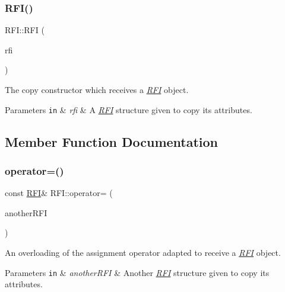 \subsubsection{\texorpdfstring{R\+F\+I()}{RFI()}}
{\footnotesize\ttfamily R\+F\+I\+::\+R\+FI (\begin{DoxyParamCaption}\item[{const \hyperlink{structRFI}{R\+FI} \&}]{rfi }\end{DoxyParamCaption})\hspace{0.3cm}{\ttfamily [inline]}}



The copy constructor which receives a {\itshape \hyperlink{structRFI}{R\+FI}} object. 


\begin{DoxyParams}[1]{Parameters}
\mbox{\tt in}  & {\em rfi} & A {\itshape \hyperlink{structRFI}{R\+FI}} structure given to copy its attributes. \\
\hline
\end{DoxyParams}


\subsection{Member Function Documentation}
\mbox{\label{structRFI_a8fcc866a09f2f88a9754e04a1d056104}} 
\subsubsection{\texorpdfstring{operator=()}{operator=()}}
{\footnotesize\ttfamily const \hyperlink{structRFI}{R\+FI}\& R\+F\+I\+::operator= (\begin{DoxyParamCaption}\item[{const \hyperlink{structRFI}{R\+FI} \&}]{another\+R\+FI }\end{DoxyParamCaption})\hspace{0.3cm}{\ttfamily [inline]}}



An overloading of the assignment operator adapted to receive a {\itshape \hyperlink{structRFI}{R\+FI}} object. 


\begin{DoxyParams}[1]{Parameters}
\mbox{\tt in}  & {\em another\+R\+FI} & Another {\itshape \hyperlink{structRFI}{R\+FI}} structure given to copy its attributes. \\
\hline
\end{DoxyParams}


